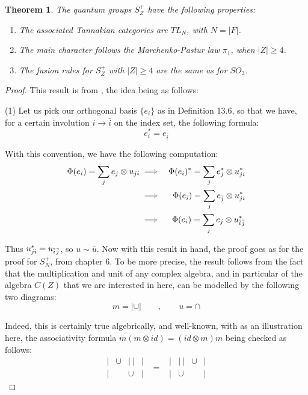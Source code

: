 \documentclass[12pt]{amsbook}
\newtheorem{theorem}{Theorem}[chapter]
\begin{document}
\begin{theorem}
The quantum groups $S_Z^+$ have the following properties: 
\begin{enumerate}
\item The associated Tannakian categories are $TL_N$, with $N=|F|$.

\item The main character follows the Marchenko-Pastur law $\pi_1$, when $|Z|\geq4$.

\item The fusion rules for $S_Z^+$ with $|Z|\geq4$ are the same as for $SO_3$.
\end{enumerate}
\end{theorem}

\begin{proof}
This result is from \cite{ba1}, the idea being as follows:

\medskip

(1) Let us pick our orthogonal basis $\{e_i\}$ as in Definition 13.6, so that we have, for a certain involution $i\to\bar{i}$ on the index set, the following formula:
$$e_i^*=e_{\bar{i}}$$

With this convention, we have the following computation:
\begin{eqnarray*}
\Phi(e_i)=\sum_je_j\otimes u_{ji}
&\implies&\Phi(e_i)^*=\sum_je_j^*\otimes u_{ji}^*\\
&\implies&\Phi(e_{\bar{i}})=\sum_je_{\bar{j}}\otimes u_{ji}^*\\
&\implies&\Phi(e_i)=\sum_je_j\otimes u_{\bar{i}\hskip0.3mm\bar{j}}^*
\end{eqnarray*}

Thus $u_{ji}^*=u_{\bar{i}\hskip0.3mm\bar{j}}$, so $u\sim\bar{u}$. Now with this result in hand, the proof goes as for the proof for $S_N^+$, from chapter 6. To be more precise, the result follows from the fact that the multiplication and unit of any complex algebra, and in particular of the algebra $C(Z)$ that we are interested in here, can be modelled by the following two diagrams:
$$m=|\cup|\qquad,\qquad u=\cap$$

Indeed, this is certainly true algebrically, and well-known, with as an illustration here, the associativity formula $m(m\otimes id)=(id\otimes m)m$ being checked as follows:
$$\begin{matrix}
|&\cup&|\ |&|\\
|&&\cup&|
\end{matrix}
\ \ =\ \ \begin{matrix}
|&|\ |&\cup&|\\
|&\cup&&|
\end{matrix}$$


\end{proof}
\end{document}

